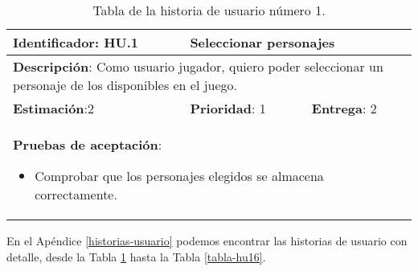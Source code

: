 \begin{table}[h]
  \begin{center}
    \begin{tabular}{|p{4cm}|p{4cm}|p{4cm}|}

    \hline
    \textbf{Identificador}: HU.1
    & \multicolumn{2}{p{8cm}|}{Seleccionar personajes}\\

    \hline
    \multicolumn{3}{|p{12cm}|}{\textbf{Descripción}: Como usuario jugador, quiero poder seleccionar un personaje de los disponibles en el juego.}\\

    \hline
    \textbf{Estimación}:2
    & \textbf{Prioridad}: 1
    & \textbf{Entrega}: 2\\

    \hline
    \multicolumn{3}{|p{12cm}|}{\textbf{Pruebas de aceptación}:
      \begin{itemize}
        \item Comprobar que los personajes elegidos se almacena correctamente.
      \end{itemize}
    }\\

    \hline

    \end{tabular}

    \caption{Tabla de la historia de usuario número 1.}
    \label{tabla-hu1}

  \end{center}
\end{table}

En el Apéndice \ref{historias-usuario} podemos encontrar las historias de usuario con detalle, desde la Tabla \ref{tabla-hu1} hasta la Tabla \ref{tabla-hu16}.

